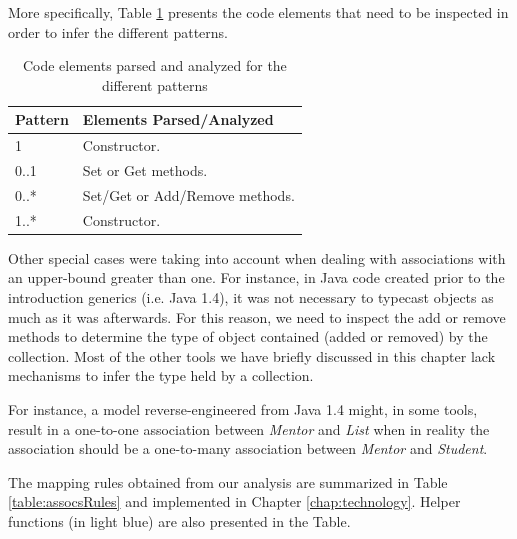 More specifically, Table \ref{table:patternsElements} presents the code elements that need to be inspected in order to infer the different patterns.

\begin{table}
\caption{Code elements parsed and analyzed for the different patterns}
\label{table:patternsElements}
\centering
    \begin{tabular}{ll}
		\toprule
		\rowcolor[HTML]{BBDAFF}
        \textbf{Pattern}   & \textbf{Elements Parsed/Analyzed}   \\ 
        \hline
		1  &     Constructor. \\ 
		0..1 &  Set or Get methods. \\ 
		0..* &  Set/Get or Add/Remove methods.\\ 
		1..*  & Constructor.\\ 
        \hline
    \end{tabular}
\end{table}

Other special cases were taking into account when dealing with associations with an upper-bound greater than one. For instance, in Java code created prior to the introduction generics (i.e. Java 1.4), it was not necessary to typecast  objects as much as it was afterwards. For this reason, we need to inspect the add or remove methods to determine the type of object contained (added or removed) by the collection. Most of the other tools we have briefly discussed in this chapter lack mechanisms to infer the type held by a collection. 

For instance, a model reverse-engineered from Java 1.4 might, in some tools, result in a one-to-one association between \textit{Mentor} and \textit{List} when in reality the association should be a one-to-many association between \textit{Mentor} and \textit{Student}.

The mapping rules obtained from our analysis are summarized in Table \ref{table:assocsRules} and implemented in Chapter \ref{chap:technology}. Helper functions (in light blue) are also presented in the Table. 

